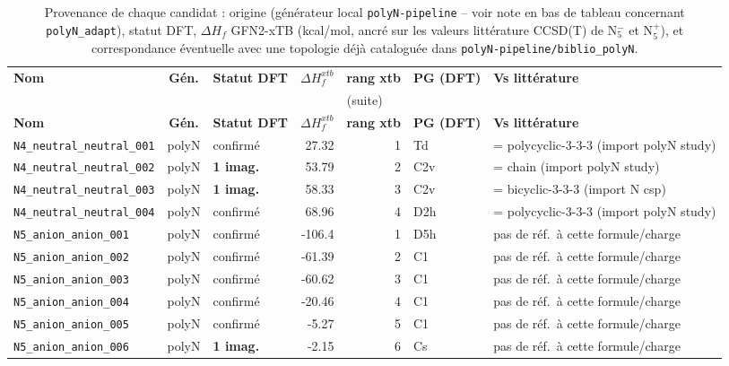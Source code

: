 \begin{longtable}{@{}p{4.2cm}cp{1.3cm}rrp{1.2cm}p{2.6cm}@{}}
\scriptsize
\caption{Provenance de chaque candidat : origine (g\'en\'erateur local \texttt{polyN-pipeline} -- voir note en bas de tableau concernant \texttt{polyN\_adapt}), statut DFT, $\Delta H_f$ GFN2-xTB (kcal/mol, ancr\'e sur les valeurs litt\'erature CCSD(T) de N$_5^-$ et N$_5^+$), et correspondance \'eventuelle avec une topologie d\'ej\`a catalogu\'ee dans \texttt{polyN-pipeline/biblio\_polyN}.}
\label{tab:provenance}\\
\toprule
\textbf{Nom} & \textbf{G\'en.} & \textbf{Statut DFT} & \textbf{$\Delta H_f^{xtb}$} & \textbf{rang xtb} & \textbf{PG (DFT)} & \textbf{Vs litt\'erature} \\
\midrule
\endfirsthead
\multicolumn{7}{c}{\small (suite)}\\
\toprule
\textbf{Nom} & \textbf{G\'en.} & \textbf{Statut DFT} & \textbf{$\Delta H_f^{xtb}$} & \textbf{rang xtb} & \textbf{PG (DFT)} & \textbf{Vs litt\'erature} \\
\midrule
\endhead
\bottomrule
\endfoot
\bottomrule
\endlastfoot
\addlinespace
\texttt{N4\_neutral\_neutral\_001} & polyN & confirm\'e & 27.32 & 1 & Td & = polycyclic-3-3-3 (import polyN study) \\
\texttt{N4\_neutral\_neutral\_002} & polyN & \textbf{1 imag.} & 53.79 & 2 & C2v & = chain (import polyN study) \\
\texttt{N4\_neutral\_neutral\_003} & polyN & \textbf{1 imag.} & 58.33 & 3 & C2v & = bicyclic-3-3-3 (import N csp) \\
\texttt{N4\_neutral\_neutral\_004} & polyN & confirm\'e & 68.96 & 4 & D2h & = polycyclic-3-3-3 (import polyN study) \\
\addlinespace
\texttt{N5\_anion\_anion\_001} & polyN & confirm\'e & -106.4 & 1 & D5h & pas de r\'ef.\ \`a cette formule/charge \\
\texttt{N5\_anion\_anion\_002} & polyN & confirm\'e & -61.39 & 2 & C1 & pas de r\'ef.\ \`a cette formule/charge \\
\texttt{N5\_anion\_anion\_003} & polyN & confirm\'e & -60.62 & 3 & C1 & pas de r\'ef.\ \`a cette formule/charge \\
\texttt{N5\_anion\_anion\_004} & polyN & confirm\'e & -20.46 & 4 & C1 & pas de r\'ef.\ \`a cette formule/charge \\
\texttt{N5\_anion\_anion\_005} & polyN & confirm\'e & -5.27 & 5 & C1 & pas de r\'ef.\ \`a cette formule/charge \\
\texttt{N5\_anion\_anion\_006} & polyN & \textbf{1 imag.} & -2.15 & 6 & Cs & pas de r\'ef.\ \`a cette formule/charge \\

\end{longtable}
